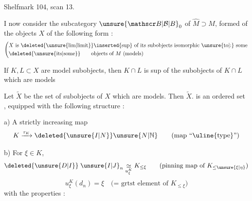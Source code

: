 Shelfmark 104, scan 13.

I now consider the subcategory $ {\unsure{\mathscr B|\mathcal B|B}}_0$ of $\widehat M\supset M$, formed of the objects $X$ of the following form :
\[
\left(\begin{aligned}
&X\text{ is }\deleted{\text{\unsure{lim|limit}}}\inserted{\text{sup}}\text{ of its subobjects isomorphic \unsure{to|:} some}\\
&\deleted{\text{\unsure{its|some}}}\qquad\text{objects of }M\text{ (models)}
\end{aligned}\right.
\]

If $K,L\subset X$ are model subobjects, then $K\cap L$ is sup of the subobjects of $K\cap L$ which are models

Let  $\widetilde X$ be the set of  subobjects of $X$ which are models. Then $\widetilde X$. is an ordered set , equipped with the following structure  : 

a)  A strictly increasing map
\[
K\xrightarrow{\tau_K}\deleted{\unsure{I|N}}\unsure{N|\mathbb N}
\qquad\text{(map ``\uline{type}'')}
\]

b) For  $\xi\in K$,    
\[
\deleted{\unsure{D|I}}\;{\unsure{I|J}}_n\underset{u_\xi^K}{\simeq}K_{\leq\xi}
\qquad\text{(pinning map of }K_{\leq\unsure{\xi|\eta}}\text{)}
\]
\[
u_\xi^K(d_n)=\xi\quad\text{(= grtst element of }K_{\leq\xi}\text{)}
\]
with  the properties  :
